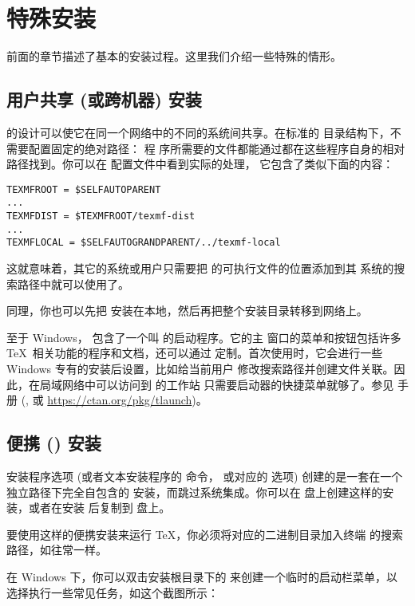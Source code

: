 \documentclass{article}
\begin{document}
\section{特殊安装}

前面的章节描述了基本的安装过程。这里我们介绍一些特殊的情形。

\subsection{用户共享 (或跨机器) 安装}
\label{sec:sharedinstall}

\TL{} 的设计可以使它在同一个网络中的不同的系统间共享。在标准的
目录结构下，不需要配置固定的绝对路径：\TL{} 程
序所需要的文件都能通过都在这些程序自身的相对路径找到。你可以在
 配置文件中看到实际的处理，
它包含了类似下面的内容：
\begin{verbatim}
TEXMFROOT = $SELFAUTOPARENT
...
TEXMFDIST = $TEXMFROOT/texmf-dist
...
TEXMFLOCAL = $SELFAUTOGRANDPARENT/../texmf-local
\end{verbatim}
这就意味着，其它的系统或用户只需要把 \TL{} 的可执行文件的位置添加到其
系统的搜索路径中就可以使用了。

同理，你也可以先把 \TL{} 安装在本地，然后再把整个安装目录转移到网络上。

至于 Windows，\TL{} 包含了一个叫  的启动程序。它的主
窗口的菜单和按钮包括许多 \TeX\ 相关功能的程序和文档，还可以通过 
定制。首次使用时，它会进行一些 Windows 专有的安装后设置，比如给当前用户
修改搜索路径并创建文件关联。因此，在局域网络中可以访问到 \TL{} 的工作站
只需要启动器的快捷菜单就够了。参见  手册 (,
或 \url{https://ctan.org/pkg/tlaunch})。

\subsection{便携 (\USB{}) 安装}
\label{sec:portable-tl}

 安装程序选项 (或者文本安装程序的  命令，
或对应的 \GUI{} 选项) 创建的是一套在一个独立路径下完全自包含的 \TL{}
安装，而跳过系统集成。你可以在 \USB{} 盘上创建这样的安装，或者在安装
后复制到 \USB{} 盘上。

要使用这样的便携安装来运行 \TeX{}，你必须将对应的二进制目录加入终端
的搜索路径，如往常一样。

在 Windows 下，你可以双击安装根目录下的 
来创建一个临时的启动栏菜单，以选择执行一些常见任务，如这个截图所示：
\end{document}
